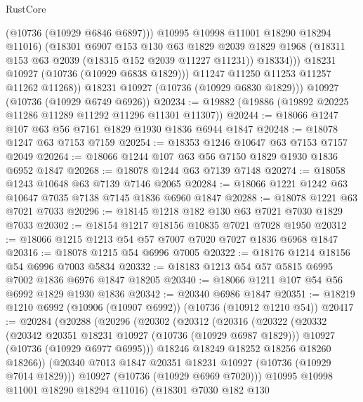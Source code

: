 \begin{lexlean}{RustCore}
\begin{coremodule}
                    (@10736 (@10929 @6846 @6897)))
                  @10995
                  @10998
                  @11001
                  @18290
                  @18294
                  @11016)
                (@18301
                  @6907
                  @153
                  @130
                  @63
                  @1829
                  @2039
                  @1829
                  @1968
                  (@18311 @153 @63 @2039 (@18315 @152 @2039 @11227 @11231))
                  @18334)))
            @18231
            @10927
            (@10736 (@10929 @6838 @1829)))
          @11247
          @11250
          @11253
          @11257
          @11262
          @11268))
      @18231
      @10927
      (@10736 (@10929 @6830 @1829)))
    @10927
    (@10736 (@10929 @6749 @6926))
@20234 := @19882 (@19886 (@19892 @20225 @11286 @11289 @11292 @11296 @11301 @11307))
@20244 := @18066 @1247 @107 @63 @56 @7161 @1829 @1930 @1836 @6944 @1847
@20248 := @18078 @1247 @63 @7153 @7159
@20254 := @18353 @1246 @10647 @63 @7153 @7157 @2049
@20264 := @18066 @1244 @107 @63 @56 @7150 @1829 @1930 @1836 @6952 @1847
@20268 := @18078 @1244 @63 @7139 @7148
@20274 := @18058 @1243 @10648 @63 @7139 @7146 @2065
@20284 := @18066 @1221 @1242 @63 @10647 @7035 @7138 @7145 @1836 @6960 @1847
@20288 := @18078 @1221 @63 @7021 @7033
@20296 := @18145 @1218 @182 @130 @63 @7021 @7030 @1829 @7033
@20302 := @18154 @1217 @18156 @10835 @7021 @7028 @1950
@20312 := @18066 @1215 @1213 @54 @57 @7007 @7020 @7027 @1836 @6968 @1847
@20316 := @18078 @1215 @54 @6996 @7005
@20322 := @18176 @1214 @18156 @54 @6996 @7003 @5834
@20332 := @18183 @1213 @54 @57 @5815 @6995 @7002 @1836 @6976 @1847 @18205
@20340 := @18066 @1211 @107 @54 @56 @6992 @1829 @1930 @1836
@20342 := @20340 @6986 @1847
@20351 := @18219 @1210 @6992 (@10906 (@10907 @6992)) (@10736 (@10912 @1210 @54))
@20417 := @20284
    (@20288
      (@20296
        (@20302
          (@20312
            (@20316
              (@20322
                (@20332
                  (@20342 @20351 @18231 @10927 (@10736 (@10929 @6987 @1829)))
                  @10927
                  (@10736 (@10929 @6977 @6995)))
                @18246
                @18249
                @18252
                @18256
                @18260
                @18266))
            (@20340 @7013 @1847 @20351 @18231 @10927 (@10736 (@10929 @7014 @1829)))
            @10927
            (@10736 (@10929 @6969 @7020)))
          @10995
          @10998
          @11001
          @18290
          @18294
          @11016)
        (@18301
          @7030
          @182
          @130

\end{coremodule}
\end{lexlean}
